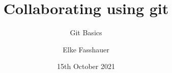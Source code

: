 \documentclass[xcolor=dvipsnames]{beamer}
\begin{document}
 

\title[]
{Collaborating using git}
\subtitle{Git Basics}
\author[E. Fasshauer]{Elke Fasshauer}
\date[15.10.21]{15th October 2021}


\begin{frame}
\titlepage
\end{frame}













\end{document}
